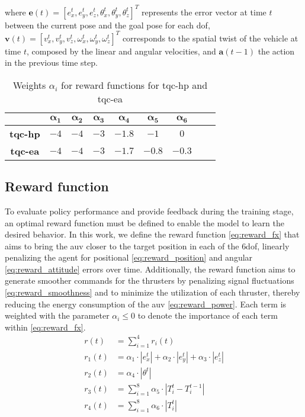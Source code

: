 \noindent where $\bm{e}(t)=[e_{x}^t, e_{y}^t, e_{z}^t, \theta_{x}^t, \theta_{y}^t, \theta_{z}^t]^T$ represents the error vector at time $t$ between the current pose and the goal pose for each \ac{dof}, $ \bm{v}(t)=[v_{x}^t, v_{y}^t, v_{z}^t, \omega_{x}^t, \omega_{y}^t, \omega_{z}^t]^T$ corresponds to the spatial twist of the vehicle at time $t$, composed by the linear and angular velocities, and $\boldsymbol{a}(t-1)$ the action in the previous time step.

\begin{table}[b!]
\centering
\caption{Weights $\alpha_i$ for reward functions for \ac{tqc-hp} and \ac{tqc-ea}}
\label{tab:weights}
\begin{tabular}{ccccccccc}
\toprule
 & $\bm{\alpha_1}$ & $\bm{\alpha_2}$ & $\bm{\alpha_3}$ & $\bm{\alpha_4}$ & $\bm{\alpha_5}$ & $\bm{\alpha_6}$  \\ \midrule
\textbf{\ac{tqc-hp}} & $-4$ & $-4$ & $-3$ & $-1.8$ & $-1$ & $0$ \\
\textbf{\ac{tqc-ea}} & $-4$ & $-4$ & $-3$ & $-1.7$ & $-0.8$ & $-0.3$  \\ \bottomrule
\end{tabular}
\end{table}

\subsection{Reward function}

To evaluate policy performance and provide feedback during the training stage, an optimal reward function must be defined to enable the model to learn the desired behavior. In this work, we define the reward function \eqref{eq:reward_fx} that aims to bring the \ac{auv} closer to the target position in each of the \ac{6dof}, linearly penalizing the agent for positional \eqref{eq:reward_position} and angular \eqref{eq:reward_attitude} errors over time. Additionally, the reward function aims to generate smoother commands for the thrusters by penalizing signal fluctuations \eqref{eq:reward_smoothness} and to minimize the utilization of each thruster, thereby reducing the energy consumption of the \ac{auv} \eqref{eq:reward_power}. Each term is weighted with the parameter  $\alpha_i \leq 0$ to denote the importance of each term within \eqref{eq:reward_fx}.
\begin{subequations}
\begin{align}
r(t) &= \sum\nolimits_{i=1}^{4} r_i(t) \label{eq:reward_fx} \\
r_1(t) &= \alpha_1 \cdot{|e_x^t|} + \alpha_2 \cdot{|e_y^t|} + \alpha_3 \cdot{|e_z^t|}\label{eq:reward_position} \\
r_2(t) &= \alpha_4 \cdot{|\theta^t|}
\label{eq:reward_attitude} \\
r_3(t) &= \sum\nolimits_{i=1}^{8} \alpha_5 \cdot \left|{T_{i}^t - T_{i}^{t-1}} \right| \label{eq:reward_smoothness} \\
r_4(t) &= \sum\nolimits_{i=1}^{8} \alpha_6 \cdot \left|{T_i^t} \right| \label{eq:reward_power}
\end{align}
\end{subequations}

